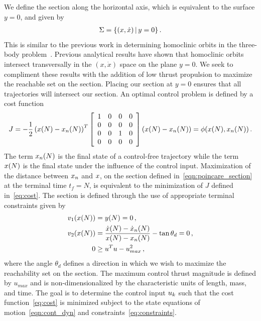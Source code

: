 We define the \Poincare section along the horizontal axis, which is equivalent to the surface \( y = 0 \), and given by
\begin{align}
        \Sigma = \left\{  ( x, \dot{x}) \, | \, y = 0 \right\} . 
        \label{eqn:poincare_section}
\end{align}
This is similar to the previous work in determining homoclinic orbits in the three-body problem~\cite{llibre1985,koon2011}.
Previous analytical results have shown that homoclinic orbits intersect transversally in the \( (x, \dot{x} ) \) space on the plane \( y = 0 \).
We seek to compliment these results with the addition of low thrust propulsion to maximize the reachable set on the \Poincare section.
Placing our section at \( y = 0\) ensures that all trajectories will intersect our section.
An optimal control problem is defined by a  cost function
\begin{equation}
        J = -\frac{1}{2} \left( x(N) - x_{n}(N)\right)^T 
        \left[
        \begin{array}{cccc}
                1 & 0& 0& 0 \\
                 0& 0& 0& 0\\
                 0 & 0 & 1 &0\\
                 0 & 0& 0& 0
        \end{array}
        \right]
        \left( x(N) - x_{n}(N)\right) = \phi(x(N),x_n(N)) \, .
        \label{eq:cost}
\end{equation}
The term \( x_n(N) \) is the final state of a control-free trajectory while the term \( x(N)\) is the final state under the influence of the control input.
Maximization of the distance between \( x_n \) and \(x \), on the \Poincare section defined in~\cref{eqn:poincare_section} at the terminal time \( t_f = N \), is equivalent to the minimization of \( J \) defined in~\cref{eq:cost}.
The \Poincare section is defined through the use of appropriate terminal constraints given by
\begin{subequations}
\begin{align}
    v_1( x(N) ) &= y(N) = 0 \, , \\ 
    v_2 ( x(N) )&=  \frac{\dot{x}(N) - \dot{x}_n(N) }{x(N) -x_n(N) } - \tan{\theta_d} = 0\, , \\
         0 &\geq u^T u - u_{max}^2 \, ,
\end{align}
    \label{eq:constraints}
\end{subequations}
where the angle \( \theta_d\) defines a direction in which we wish to maximize the reachability set on the \Poincare section.
The maximum control thrust magnitude is defined by \( u_{max} \) and is non-dimensionalized by the characteristic units of length, mass, and time.
The goal is to determine the control input \( u_k\) such that the cost function~\cref{eq:cost} is minimized subject to the state equations of motion~\cref{eqn:cont_dyn} and constraints~\cref{eq:constraints}.

